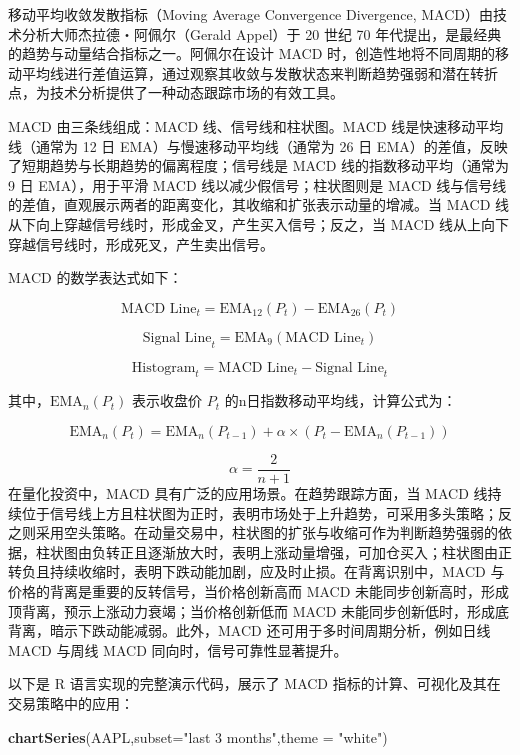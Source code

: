 \documentclass[]{ctexbook}
\newenvironment{Shaded}{\begin{snugshade}}{\end{snugshade}}
\newcommand{\AttributeTok}[1]{\textcolor[rgb]{0.13,0.29,0.53}{#1}}
\newcommand{\FunctionTok}[1]{\textcolor[rgb]{0.13,0.29,0.53}{\textbf{#1}}}
\newcommand{\NormalTok}[1]{#1}
\newcommand{\StringTok}[1]{\textcolor[rgb]{0.31,0.60,0.02}{#1}}
\begin{document}
移动平均收敛发散指标（Moving Average Convergence Divergence, MACD）由技术分析大师杰拉德・阿佩尔（Gerald Appel）于 20 世纪 70 年代提出，是最经典的趋势与动量结合指标之一。阿佩尔在设计 MACD 时，创造性地将不同周期的移动平均线进行差值运算，通过观察其收敛与发散状态来判断趋势强弱和潜在转折点，为技术分析提供了一种动态跟踪市场的有效工具。

MACD 由三条线组成：MACD 线、信号线和柱状图。MACD 线是快速移动平均线（通常为 12 日 EMA）与慢速移动平均线（通常为 26 日 EMA）的差值，反映了短期趋势与长期趋势的偏离程度；信号线是 MACD 线的指数移动平均（通常为 9 日 EMA），用于平滑 MACD 线以减少假信号；柱状图则是 MACD 线与信号线的差值，直观展示两者的距离变化，其收缩和扩张表示动量的增减。当 MACD 线从下向上穿越信号线时，形成金叉，产生买入信号；反之，当 MACD 线从上向下穿越信号线时，形成死叉，产生卖出信号。

MACD 的数学表达式如下：

\[\text{MACD Line}_t = \text{EMA}_{12}(P_t) - \text{EMA}_{26}(P_t)\]

\[\text{Signal Line}_t = \text{EMA}_9(\text{MACD Line}_t)\]

\[\text{Histogram}_t = \text{MACD Line}_t - \text{Signal Line}_t\]

其中，\(\text{EMA}_n(P_t)\) 表示收盘价 \(P_t\) 的n日指数移动平均线，计算公式为：

\[\text{EMA}_n(P_t) = \text{EMA}_{n}(P_{t-1}) + \alpha \times (P_t - \text{EMA}_{n}(P_{t-1}))\]

\[\alpha = \frac{2}{n + 1}\]
在量化投资中，MACD 具有广泛的应用场景。在趋势跟踪方面，当 MACD 线持续位于信号线上方且柱状图为正时，表明市场处于上升趋势，可采用多头策略；反之则采用空头策略。在动量交易中，柱状图的扩张与收缩可作为判断趋势强弱的依据，柱状图由负转正且逐渐放大时，表明上涨动量增强，可加仓买入；柱状图由正转负且持续收缩时，表明下跌动能加剧，应及时止损。在背离识别中，MACD 与价格的背离是重要的反转信号，当价格创新高而 MACD 未能同步创新高时，形成顶背离，预示上涨动力衰竭；当价格创新低而 MACD 未能同步创新低时，形成底背离，暗示下跌动能减弱。此外，MACD 还可用于多时间周期分析，例如日线 MACD 与周线 MACD 同向时，信号可靠性显著提升。

以下是 R 语言实现的完整演示代码，展示了 MACD 指标的计算、可视化及其在交易策略中的应用：

\begin{Shaded}
\begin{Highlighting}[]
\FunctionTok{chartSeries}\NormalTok{(AAPL,}\AttributeTok{subset=}\StringTok{"last 3 months"}\NormalTok{,}\AttributeTok{theme =} \StringTok{"white"}\NormalTok{)}
\end{Highlighting}
\end{Shaded}
\end{document}
